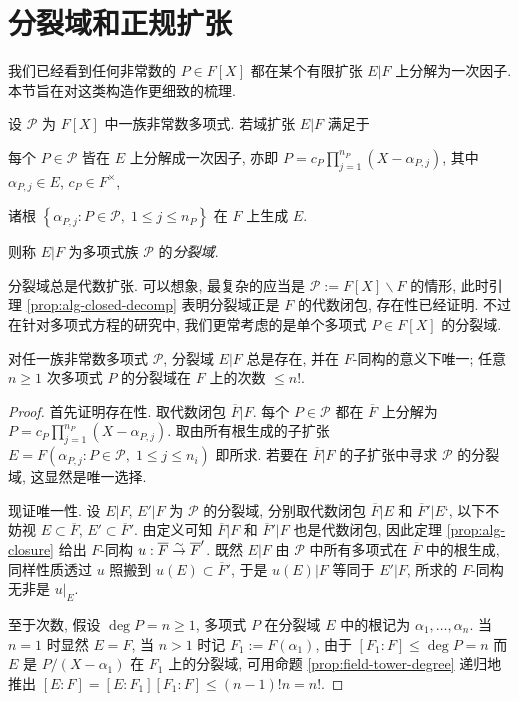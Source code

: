 \section{分裂域和正规扩张}\label{sec:splitting-field}
我们已经看到任何非常数的 $P \in F[X]$ 都在某个有限扩张 $E|F$ 上分解为一次因子. 本节旨在对这类构造作更细致的梳理.

\begin{definition}
	设 $\mathcal{P}$ 为 $F[X]$ 中一族非常数多项式. 若域扩张 $E|F$ 满足于
	\begin{compactitem}
		\item 每个 $P \in \mathcal{P}$ 皆在 $E$ 上分解成一次因子, 亦即 $P = c_P \prod_{j=1}^{n_P}(X - \alpha_{P,j})$, 其中 $\alpha_{P,j} \in E$, $c_P \in F^\times$,
		\item 诸根 $\left\{ \alpha_{P,j} : P \in \mathcal{P},\; 1 \leq j \leq n_P \right\}$ 在 $F$ 上生成 $E$.
	\end{compactitem}
	则称 $E|F$ 为多项式族 $\mathcal{P}$ 的\emph{分裂域}.
\end{definition}
分裂域总是代数扩张. 可以想象, 最复杂的应当是 $\mathcal{P} := F[X] \smallsetminus F$ 的情形, 此时引理 \ref{prop:alg-closed-decomp} 表明分裂域正是 $F$ 的代数闭包, 存在性已经证明. 不过在针对多项式方程的研究中, 我们更常考虑的是单个多项式 $P \in F[X]$ 的分裂域.

\begin{proposition}
	对任一族非常数多项式 $\mathcal{P}$, 分裂域 $E|F$ 总是存在, 并在 $F$-同构的意义下唯一; 任意 $n \geq 1$ 次多项式 $P$ 的分裂域在 $F$ 上的次数 $\leq n!$.
\end{proposition}
\begin{proof}
	首先证明存在性. 取代数闭包 $\overline{F}|F$. 每个 $P \in \mathcal{P}$ 都在 $\overline{F}$ 上分解为 $P = c_P \prod_{j=1}^{n_P}(X - \alpha_{P,j})$. 取由所有根生成的子扩张 $E = F\left( \alpha_{P,j} : P \in \mathcal{P},\; 1 \leq j \leq n_i \right)$ 即所求. 若要在 $\overline{F}|F$ 的子扩张中寻求 $\mathcal{P}$ 的分裂域, 这显然是唯一选择.

	现证唯一性. 设 $E|F$, $E'|F$ 为 $\mathcal{P}$ 的分裂域, 分别取代数闭包 $\overline{F}|E$ 和 $\overline{F}'|E‘$, 以下不妨视 $E \subset \overline{F}$, $E' \subset \overline{F}'$. 由定义可知 $\overline{F}|F$ 和 $\overline{F}'|F$ 也是代数闭包, 因此定理 \ref{prop:alg-closure} 给出 $F$-同构 $u: \overline{F} \stackrel{\sim}{\rightarrow} \overline{F}'$. 既然 $E|F$ 由 $\mathcal{P}$ 中所有多项式在 $\overline{F}$ 中的根生成, 同样性质透过 $u$ 照搬到 $u(E) \subset \overline{F}'$, 于是 $u(E)|F$ 等同于 $E'|F$, 所求的 $F$-同构无非是 $u|_E$.

	至于次数, 假设 $\deg P = n \geq 1$, 多项式 $P$ 在分裂域 $E$ 中的根记为 $\alpha_1, \ldots, \alpha_n$. 当 $n=1$ 时显然 $E=F$, 当 $n>1$ 时记 $F_1 := F(\alpha_1)$, 由于 $[F_1:F] \leq \deg P = n$ 而 $E$ 是 $P/(X-\alpha_1)$ 在 $F_1$ 上的分裂域, 可用命题 \ref{prop:field-tower-degree} 递归地推出 $[E:F] = [E:F_1][F_1:F] \leq (n-1)! n = n!$.
\end{proof}

